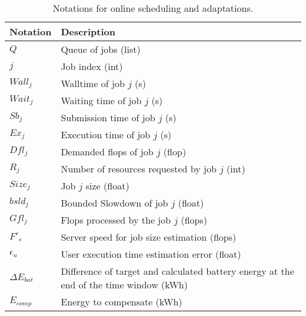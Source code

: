 \begin{table*}[!htb]
\centering
\caption{Notations for online scheduling and adaptations.}
\label{tab:notation_job}
\begin{tabular}{l|l}
    \hline
    Notation & Description \\\hline\hline
    $Q$ & Queue of jobs (list)\\
    $j$ & Job index (int)\\
    $Wall_j$ & Walltime of job $j$ (s)\\
    $Wait_j$ & Waiting time of job $j$ (s)\\
    $Sb_j$ & Submission time of job $j$ (s)\\
    $Ex_j$ & Execution time of job $j$ (s)\\
    $Dfl_j$ & Demanded flops of job $j$ (flop)\\
    $R_j$ & Number of resources requested by job $j$ (int) \\
    $Size_j$ & Job $j$ size (float)\\
    $bsld_j$ & Bounded Slowdown of job $j$ (float)\\
    $Gfl_j$ & Flops processed by the job $j$ (flops)\\
    $F'_{s}$ & Server speed for job size estimation (flops)\\
    $\epsilon_{u}$ & User execution time estimation error (float)\\
    $\Delta E_{bat}$ & Difference of target and calculated battery energy at the end of the time window (kWh)\\
    $E_{comp}$ & Energy to compensate (kWh)\\
    \hline
\end{tabular}
\end{table*}